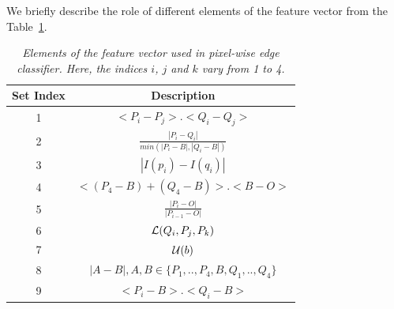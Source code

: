 We briefly describe the role of different elements of the feature vector from the Table~\ref{table:featureVector}.

\begin{table}[h]
\begin{center}
\caption{\it Elements of the feature vector used in pixel-wise edge classifier. Here, the indices 
$i$, $j$ and $k$ vary from 1 to 4.}
\label{table:featureVector}
       \begin{tabular}{|c||c|}
       \hline
        Set Index & Description \\ 
        \hline 
        \hline
				
				1 &
				$<P_i-P_j>.<Q_i-Q_j>$ 
				\\ \hline
				
				2 &
				$\frac{|P_i-Q_i|}{min(|P_i-B|, |Q_i-B|)}$
				\\ \hline
				
				3 &
				$|I(p_i)-I(q_i)|$
				\\ \hline
				
				4 &
				 $<(P_4-B) + (Q_4-B)>.<B-O>$
				\\ \hline
				
				5 & 
				$\frac{|P_i-O|}{|P_{i-1}-O|}$
				\\ \hline
				
				6 &
				${\cal L}(Q_i,P_j,P_k)$
				\\ \hline
				
				7 &
				${\cal U}(b)$
				\\ \hline
				
				8 & 
				$|A-B|,A,B \in \{P_1,..,P_4,B,Q_1,..,Q_4\}$
				\\ \hline
				
				9 & 
				$<P_i-B>.<Q_i-B>$
				\\ \hline
	\end{tabular}
\end{center}
\end{table}


